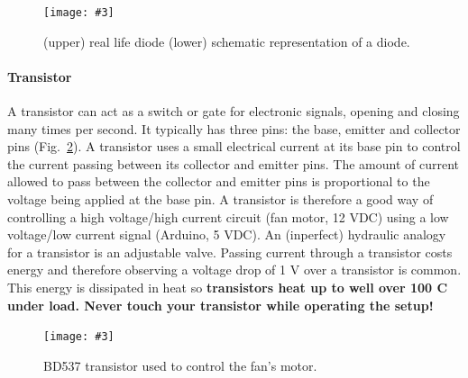 \documentclass[10pt,twoside,openright]{article}
\newcommand{\mijnfiguur}[5][ht]{            %
    \begin{figure}[#1]                      %
        \begin{center}                      %
            \texttt{[image: \#3]}        %
        \end{center}
        \caption{#4\label{#5}}          %
    \end{figure}
    }
\begin{document}
\mijnfiguur[h!]{width=6cm}{diode.jpg}{(upper) real life diode (lower) schematic representation of a diode.}{fig:diode}


\paragraph{Transistor} A transistor can act as a switch or gate for electronic signals, opening and closing many times per second. It typically has three pins: the base, emitter and collector pins (Fig.~\ref{fig:transistor}). A transistor uses a small electrical current at its base pin to control the current passing between its collector and emitter pins. The amount of current allowed to pass between the collector and emitter pins is proportional to the voltage being applied at the base pin. A transistor is therefore a good way of controlling a high voltage/high current circuit (fan motor, 12 VDC) using a low voltage/low current signal (Arduino, 5 VDC). An (inperfect) hydraulic analogy for a transistor is an adjustable valve. Passing current through a transistor costs energy and therefore observing a voltage drop of 1 V over a transistor is common. This energy is dissipated in heat so \textbf{transistors heat up to well over 100 \textdegree C under load. Never touch your transistor while operating the setup!}\\

\mijnfiguur[h!]{width=6cm}{BD537.jpg}{BD537 transistor used to control the fan's motor.}{fig:transistor}

\end{document}

